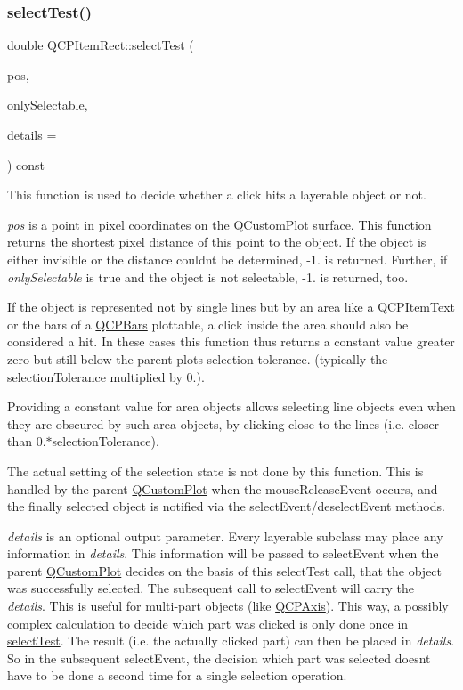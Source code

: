 \subsubsection{\texorpdfstring{select\+Test()}{selectTest()}}
{\footnotesize\ttfamily double Q\+C\+P\+Item\+Rect\+::select\+Test (\begin{DoxyParamCaption}\item[{const Q\+PointF \&}]{pos,  }\item[{bool}]{only\+Selectable,  }\item[{Q\+Variant $\ast$}]{details = {} }\end{DoxyParamCaption}) const\hspace{0.3cm}{\ttfamily [virtual]}}

This function is used to decide whether a click hits a layerable object or not.

{\itshape pos} is a point in pixel coordinates on the \hyperlink{class_q_custom_plot}{Q\+Custom\+Plot} surface. This function returns the shortest pixel distance of this point to the object. If the object is either invisible or the distance couldn\textquotesingle{}t be determined, -\/1. is returned. Further, if {\itshape only\+Selectable} is true and the object is not selectable, -\/1. is returned, too.

If the object is represented not by single lines but by an area like a \hyperlink{class_q_c_p_item_text}{Q\+C\+P\+Item\+Text} or the bars of a \hyperlink{class_q_c_p_bars}{Q\+C\+P\+Bars} plottable, a click inside the area should also be considered a hit. In these cases this function thus returns a constant value greater zero but still below the parent plot\textquotesingle{}s selection tolerance. (typically the selection\+Tolerance multiplied by 0.).

Providing a constant value for area objects allows selecting line objects even when they are obscured by such area objects, by clicking close to the lines (i.\+e. closer than 0.$\ast$selection\+Tolerance).

The actual setting of the selection state is not done by this function. This is handled by the parent \hyperlink{class_q_custom_plot}{Q\+Custom\+Plot} when the mouse\+Release\+Event occurs, and the finally selected object is notified via the select\+Event/deselect\+Event methods.

{\itshape details} is an optional output parameter. Every layerable subclass may place any information in {\itshape details}. This information will be passed to select\+Event when the parent \hyperlink{class_q_custom_plot}{Q\+Custom\+Plot} decides on the basis of this select\+Test call, that the object was successfully selected. The subsequent call to select\+Event will carry the {\itshape details}. This is useful for multi-\/part objects (like \hyperlink{class_q_c_p_axis}{Q\+C\+P\+Axis}). This way, a possibly complex calculation to decide which part was clicked is only done once in \hyperlink{class_q_c_p_item_rect_a2e68621b75bae4da6ae0ab2cdd0dd733}{select\+Test}. The result (i.\+e. the actually clicked part) can then be placed in {\itshape details}. So in the subsequent select\+Event, the decision which part was selected doesn\textquotesingle{}t have to be done a second time for a single selection operation.

